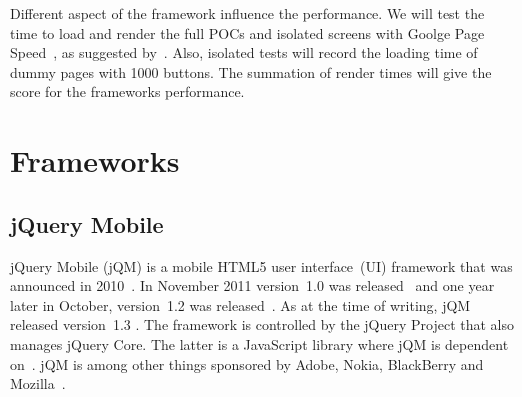 \documentclass[a4paper]{artikel3}
\renewcommand{\paragraph}[1]{\vspace{2mm} \noindent {\bf #1}  }
\begin{document}
\paragraph{Performance}%
Different aspect of the framework influence the performance.  We will test the time to load and render the full POCs and isolated screens with Goolge Page Speed~\cite{Google2012},  as suggested by~\cite{Morgan2011}.   Also,  isolated tests will record the loading time of dummy pages with 1000 buttons.  The summation of render times will give the score for the frameworks performance.



\section{Frameworks} %
\label{sec:frameworks}

\subsection{jQuery Mobile} %
\label{sec:jqm}

jQuery Mobile (jQM) is a mobile HTML5 user interface~(UI) framework that was announced in 2010~\cite{Resig2010}. 
In November 2011 version~1.0 was released~\cite{Parker2011} and one year later in October, version~1.2 was released~\cite{Parker2012}. 
As at the time of writing, jQM released version~1.3 \cite{Parker2013a}.
The framework is controlled by the jQuery Project that also manages jQuery Core. 
The latter is a JavaScript library where jQM is dependent on~\cite{JQuery2012}. 
jQM is among other things sponsored by Adobe, Nokia, BlackBerry and Mozilla~\cite{JQuery2012a}.
\end{document}

